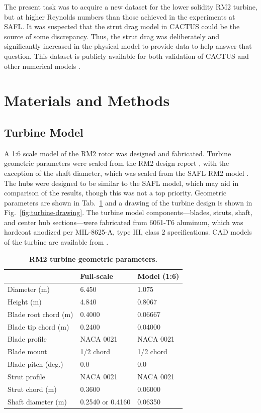 \documentclass[10pt,letterpaper]{article}
\begin{document}
The present task was to acquire a new dataset for the lower solidity RM2
turbine, but at higher Reynolds numbers than those achieved in the experiments
at SAFL. It was suspected that the strut drag model in CACTUS could be the
source of some discrepancy. Thus, the strut drag was deliberately and
significantly increased in the physical model to provide data to help answer
that question. This dataset is publicly available for both validation of CACTUS
and other numerical models \cite{Bachant2015-RM2-data}.


\section*{Materials and Methods}

\subsection*{Turbine Model}


A 1:6 scale model of the RM2 rotor was designed and fabricated. Turbine
geometric parameters were scaled from the RM2 design report \cite{Barone2011},
with the exception of the shaft diameter, which was scaled from the SAFL RM2
model \cite{Hill2014}. The hubs were designed to be similar to the SAFL model,
which may aid in comparison of the results, though this was not a top priority.
Geometric parameters are shown in Tab.~\ref{tab:turb-geom} and a drawing of the
turbine design is shown in Fig.~\ref{fig:turbine-drawing}. The turbine model
components---blades, struts, shaft, and center hub sections---were fabricated
from 6061-T6 aluminum, which was hardcoat anodized per MIL-8625-A, type III,
class 2 specifications. CAD models of the turbine are available from
\cite{Bachant2015-RM2-CAD}.

\begin{table}[ht]
\centering
\begin{tabular}{l|l|l}
   & Full-scale & Model (1:6) \\
\hline
Diameter (m)   & 6.450 & 1.075 \\
Height (m)     & 4.840 & 0.8067 \\
Blade root chord (m) & 0.4000 & 0.06667 \\
Blade tip chord (m)  & 0.2400 & 0.04000 \\
Blade profile & NACA 0021 & NACA 0021 \\
Blade mount & 1/2 chord & 1/2 chord \\
Blade pitch (deg.) & 0.0 & 0.0 \\
Strut profile & NACA 0021 & NACA 0021 \\
Strut chord (m) & 0.3600 & 0.06000 \\
Shaft diameter (m) & 0.2540 \cite{Beam2011} or 0.4160 \cite{Hill2014} & 0.06350\\
\end{tabular}
\caption{\textbf{RM2 turbine geometric parameters.}}
\label{tab:turb-geom}
\end{table}
\end{document}
